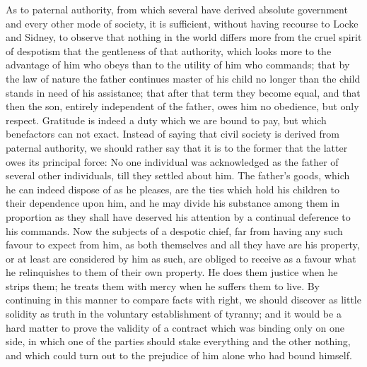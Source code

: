 \documentclass[11pt,twocolumn]{ltugboat}
\begin{document}
As to paternal authority, from which several have derived absolute
government and every other mode of society, it is sufficient, without
having recourse to Locke and Sidney, to observe that nothing in the
world differs more from the cruel spirit of despotism that the
gentleness of that authority, which looks more to the advantage of him
who obeys than to the utility of him who commands; that by the law of
nature the father continues master of his child no longer than the
child stands in need of his assistance; that after that term they
become equal, and that then the son, entirely independent of the
father, owes him no obedience, but only respect. Gratitude is indeed
a duty which we are bound to pay, but which benefactors can not exact.
Instead of saying that civil society is derived from paternal
authority, we should rather say that it is to the former that the
latter owes its principal force: No one individual was acknowledged as
the father of several other individuals, till they settled about him.
The father's goods, which he can indeed dispose of as he pleases, are
the ties which hold his children to their dependence upon him, and he
may divide his substance among them in proportion as they shall have
deserved his attention by a continual deference to his commands. Now
the subjects of a despotic chief, far from having any such favour to
expect from him, as both themselves and all they have are his
property, or at least are considered by him as such, are obliged to
receive as a favour what he relinquishes to them of their own
property. He does them justice when he strips them; he treats them
with mercy when he suffers them to live. By continuing in this manner
to compare facts with right, we should discover as little solidity as
truth in the voluntary establishment of tyranny; and it would be a
hard matter to prove the validity of a contract which was binding only
on one side, in which one of the parties should stake everything and
the other nothing, and which could turn out to the prejudice of him
alone who had bound himself.
\end{document}
